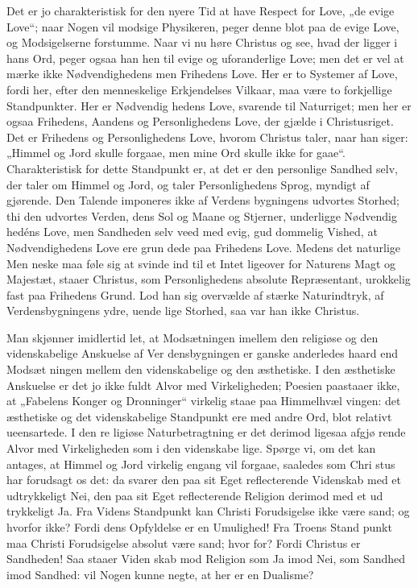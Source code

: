 \documentclass[12pt]{book}
\newcommand{\opage}[1]{\marginnote{\footnotesize\textit{[#1]}}}
\begin{document}
Det er jo charakteristisk for den nyere Tid at have
Respect for Love, „de evige Love“; naar Nogen vil
modsige Physikeren, peger denne blot paa de evige
Love, og Modsigelserne forstumme. Naar vi nu
høre Christus og see, hvad der ligger i hans Ord,
peger ogsaa han hen til evige og uforanderlige Love;
men det er vel at mærke ikke Nødvendighedens men
Frihedens Love. Her er to Systemer af Love, fordi
her, efter den menneskelige Erkjendelses Vilkaar, maa
være to forkjellige Standpunkter. Her er Nødvendig\-%
hedens Love, svarende til Naturriget; men her er ogsaa
Frihedens, Aandens og Personlighedens Love, der gjælde
i Christusriget. Det er Frihedens og Personlighedens
Love, hvorom Christus taler, naar han siger: „Himmel
og Jord skulle forgaae, men mine Ord skulle ikke for\-%
gaae“. Charakteristisk for dette Standpunkt er, at det
er den personlige Sandhed selv, der taler om Himmel
og Jord, og taler Personlighedens Sprog, myndigt af\-%
gjørende. Den Talende imponeres ikke af Verdens\-%
bygningens udvortes Storhed; thi den udvortes Verden,
dens Sol og Maane og Stjerner, underligge Nødvendig\-%
hedéns Love, men Sandheden selv veed med evig, gud\-%
dommelig Vished, at Nødvendighedens Love ere grun\-%
\opage{203}\setcounter{footnote}{0}%
dede paa Frihedens Love. Medens det naturlige Men\-%
neske maa føle sig at svinde ind til et Intet ligeover\-%
for Naturens Magt og Majestæt, staaer Christus, som
Personlighedens absolute Repræsentant, urokkelig fast
paa Frihedens Grund. Lod han sig overvælde af
stærke Naturindtryk, af Verdensbygningens ydre, uende\-%
lige Storhed, saa var han ikke Christus.

Man skjønner imidlertid let, at Modsætningen imellem
den religiøse og den videnskabelige Anskuelse af Ver\-%
densbygningen er ganske anderledes haard end Modsæt\-%
ningen mellem den videnskabelige og den æsthetiske. I
den æsthetiske Anskuelse er det jo ikke fuldt Alvor med
Virkeligheden; Poesien paastaaer ikke, at „Fabelens
Konger og Dronninger“ virkelig staae paa Himmelhvæl\-%
vingen: det æsthetiske og det videnskabelige Standpunkt
ere med andre Ord, blot relativt ueensartede. I den re\-%
ligiøse Naturbetragtning er det derimod ligesaa afgjø\-%
rende Alvor med Virkeligheden som i den videnskabe\-%
lige. Spørge vi, om det kan antages, at Himmel og
Jord virkelig engang vil forgaae, saaledes som Chri\-%
stus har forudsagt os det: da svarer den paa sit Eget
reflecterende Videnskab med et udtrykkeligt Nei, den
paa sit Eget reflecterende Religion derimod med et ud\-%
trykkeligt Ja. Fra Videns Standpunkt kan Christi
Forudsigelse ikke være sand; og hvorfor ikke? Fordi
dens Opfyldelse er en Umulighed! Fra Troens Stand\-%
punkt maa Christi Forudsigelse absolut være sand; hvor\-%
for? Fordi Christus er Sandheden! Saa staaer Viden\-%
skab mod Religion som Ja imod Nei, som Sandhed
imod Sandhed: vil Nogen kunne negte, at her er en
Dualisme?
\end{document}
